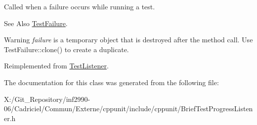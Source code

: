 Called when a failure occurs while running a test. 

\begin{DoxySeeAlso}{See Also}
\hyperlink{class_test_failure}{Test\-Failure}. 
\end{DoxySeeAlso}
\begin{DoxyWarning}{Warning}
{\itshape failure} is a temporary object that is destroyed after the method call. Use Test\-Failure\-::clone() to create a duplicate. 
\end{DoxyWarning}


Reimplemented from \hyperlink{class_test_listener_a103216a5814c907f7b752b969477e765}{Test\-Listener}.



The documentation for this class was generated from the following file\-:\begin{DoxyCompactItemize}
\item 
X\-:/\-Git\-\_\-\-Repository/inf2990-\/06/\-Cadriciel/\-Commun/\-Externe/cppunit/include/cppunit/Brief\-Test\-Progress\-Listener.\-h\end{DoxyCompactItemize}
